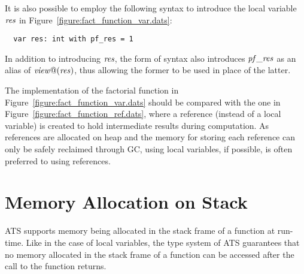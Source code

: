 It is also possible to employ the following syntax to introduce the local
variable ${\it res}$ in Figure~\ref{figure:fact_function_var.dats}:
\begin{verbatim}
  var res: int with pf_res = 1
\end{verbatim}
In addition to introducing ${\it res}$, the form of syntax also introduces
${\it pf\_res}$ as an alias of ${\it view@}({\it res})$, thus allowing the
former to be used in place of the latter.

The implementation of the factorial function in
Figure~\ref{figure:fact_function_var.dats} should be compared with the one
in Figure~\ref{figure:fact_function_ref.dats}, where a reference (instead
of a local variable) is created to hold intermediate results during
computation. As references are allocated on heap and the memory for storing
each reference can only be safely reclaimed through GC, using local
variables, if possible, is often preferred to using references.

\section{Memory Allocation on Stack}
ATS supports memory being allocated in the stack frame of a function at
run-time. Like in the case of local variables, the type system of ATS
guarantees that no memory allocated in the stack frame of a function can be
accessed after the call to the function returns.


